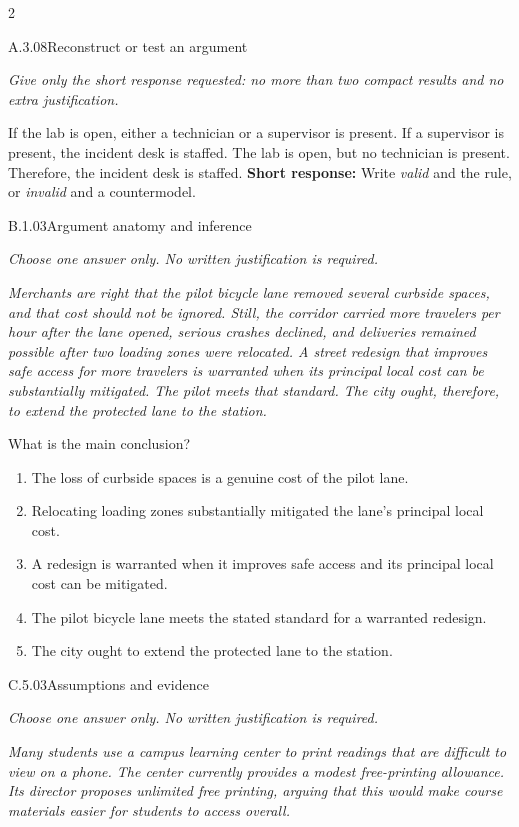 \documentclass[9pt]{extarticle}
\newcommand{\choice}[1]{\item #1}
\begin{document}
\CoreWorkArea
\FormBreak
{}
\begin{multicols}{2}
\begin{DenseCoreProblem}{A.3.08}{Reconstruct or test an argument}
{\scriptsize\textit{Give only the short response requested: no more than two compact results and no extra justification.}\par}
If the lab is open, either a technician or a supervisor is present. If a supervisor is present, the incident desk is staffed. The lab is open, but no technician is present. Therefore, the incident desk is staffed.
\textbf{Short response:} Write \emph{valid} and the rule, or \emph{invalid} and a countermodel.
\end{DenseCoreProblem}
\begin{DenseCoreProblem}{B.1.03}{Argument anatomy and inference}
{\scriptsize\textit{Choose one answer only. No written justification is required.}\par}
\emph{Merchants are right that the pilot bicycle lane removed several curbside spaces, and that cost should not be ignored. Still, the corridor carried more travelers per hour after the lane opened, serious crashes declined, and deliveries remained possible after two loading zones were relocated. A street redesign that improves safe access for more travelers is warranted when its principal local cost can be substantially mitigated. The pilot meets that standard. The city ought, therefore, to extend the protected lane to the station.}

What is the main conclusion?
\begin{enumerate}[label=(\alph*)]
  \choice{The loss of curbside spaces is a genuine cost of the pilot lane.}
  \choice{Relocating loading zones substantially mitigated the lane's principal local cost.}
  \choice{A redesign is warranted when it improves safe access and its principal local cost can be mitigated.}
  \choice{The pilot bicycle lane meets the stated standard for a warranted redesign.}
  \choice{The city ought to extend the protected lane to the station.}
\end{enumerate}
\end{DenseCoreProblem}
\columnbreak
\begin{DenseCoreProblem}{C.5.03}{Assumptions and evidence}
{\scriptsize\textit{Choose one answer only. No written justification is required.}\par}
\emph{Many students use a campus learning center to print readings that are difficult to view on a phone. The center currently provides a modest free-printing allowance. Its director proposes unlimited free printing, arguing that this would make course materials easier for students to access overall.}


\end{DenseCoreProblem}
\end{multicols}
\end{document}
